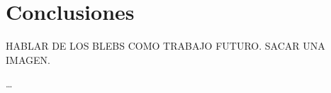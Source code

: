 \chapter{Conclusiones}
\label{cap:conclusions}

HABLAR DE LOS BLEBS COMO TRABAJO FUTURO. SACAR UNA IMAGEN.

\dots
